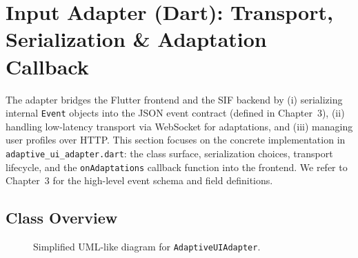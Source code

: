 \documentclass[openany]{book}
\begin{document}
\section{Input Adapter (Dart): Transport, Serialization \& Adaptation Callback}
The adapter bridges the Flutter frontend and the SIF backend by (i) serializing internal \texttt{Event} objects into the JSON event contract (defined in Chapter~3), (ii) handling low-latency transport via WebSocket for adaptations, and (iii) managing user profiles over HTTP. This section focuses on the concrete implementation in \texttt{adaptive\_ui\_adapter.dart}: the class surface, serialization choices, transport lifecycle, and the \texttt{onAdaptations} callback function into the frontend. We refer to Chapter~3 for the high-level event schema and field definitions.

\subsection{Class Overview}
\begin{figure}[H]
\centering
{}
\caption{Simplified UML-like diagram for \texttt{AdaptiveUIAdapter}.}
\end{figure}
\end{document}
